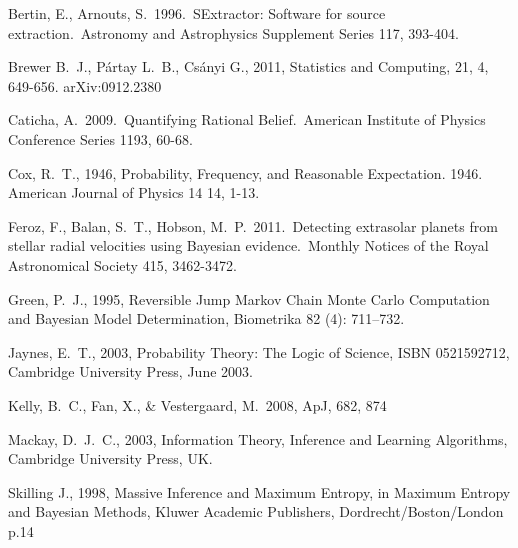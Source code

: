 \documentclass[letterpaper, 11pt]{article}
\begin{document}
\begin{thebibliography}{99}
 Bertin, E., Arnouts, S.\ 1996.\ SExtractor: Software for source extraction.\ Astronomy and Astrophysics Supplement Series 117, 393-404.

 Brewer B.~J., P{\'a}rtay L.~B.,
Cs{\'a}nyi G., 2011, Statistics and Computing, 21, 4, 649-656. arXiv:0912.2380

 Caticha, A.\ 2009.\ 
Quantifying Rational Belief.\ American Institute of Physics Conference 
Series 1193, 60-68. 

 Cox, R.~T., 1946, Probability, Frequency, and Reasonable Expectation. 1946. American Journal of Physics 14 14, 1-13.

 Feroz, F., Balan, S.~T., 
Hobson, M.~P.\ 2011.\ Detecting extrasolar planets from stellar radial 
velocities using Bayesian evidence.\ Monthly Notices of the Royal 
Astronomical Society 415, 3462-3472. 

Green, P.~J., 1995, Reversible Jump Markov Chain Monte Carlo Computation and Bayesian Model Determination, Biometrika 82 (4): 711–732.

 Jaynes, E.~T., 2003, Probability Theory: The
Logic of Science, ISBN 0521592712, Cambridge University Press, June 2003.

 Kelly, B.~C., Fan, X., 
\& Vestergaard, M.\ 2008, ApJ, 682, 874 

 Mackay, D.~J.~C., 2003, Information Theory,
Inference and Learning Algorithms, Cambridge University Press, UK.

Skilling J., 1998, Massive Inference and Maximum Entropy, in Maximum Entropy 
and Bayesian Methods, Kluwer Academic Publishers, Dordrecht/Boston/London p.14
\end{thebibliography}
\end{document}
